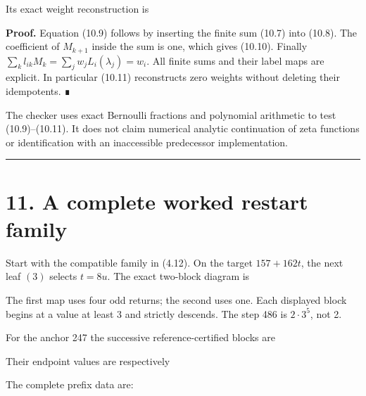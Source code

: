 Its exact weight reconstruction is


\textbf{Proof.} Equation (10.9) follows by inserting the finite sum
(10.7) into (10.8). The coefficient of \(M_{k+1}\) inside the sum is
one, which gives (10.10). Finally
\(\sum_k l_{ik}M_k=\sum_jw_jL_i(\lambda_j)=w_i\). All finite sums and
their label maps are explicit. In particular (10.11) reconstructs zero
weights without deleting their idempotents. ∎

The checker uses exact Bernoulli fractions and polynomial arithmetic to
test (10.9)--(10.11). It does not claim numerical analytic continuation
of zeta functions or identification with an inaccessible predecessor
implementation.

\begin{center}\rule{0.5\linewidth}{0.5pt}\end{center}

\section{11. A complete worked restart family}

Start with the compatible family in (4.12). On the target \(157+162t\),
the next leaf \((3)\) selects \(t=8u\). The exact two-block diagram is


The first map uses four odd returns; the second uses one. Each displayed
block begins at a value at least 3 and strictly descends. The step 486
is \(2\cdot3^5\), not 2.

For the anchor 247 the successive reference-certified blocks are


Their endpoint values are respectively


The complete prefix data are:


